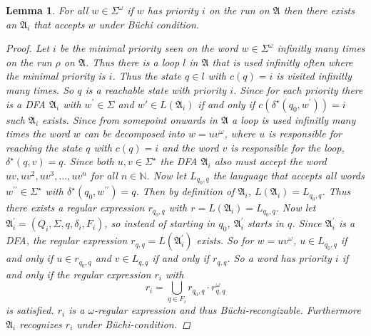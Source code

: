 \documentclass[10pt]{article}
\theoremstyle{definition}
\theoremstyle{plain}
\newtheorem{lemma}{Lemma}
\theoremstyle{remark}
\begin{document}
  \begin{lemma}
    For all $w\in \Sigma^\omega$ if $w$ has priority $i$ on the run on
    $\mathfrak{A}$ then there exists an $\mathfrak{A}_i$ that accepts $w$ under
    Büchi condition.
    \begin{proof}
      Let $i$ be the minimal priority seen on the word $w\in\Sigma^\omega$
      infinitly many times on the run $\rho$ on $\mathfrak{A}$. Thus there is a
      loop $l$ in $\mathfrak{A}$ that is used infinitly often where the minimal 
      priority is $i$. Thus the state $q\in l$ with $c(q)=i$ is visited infinitly 
      many times. So $q$ is a reachable state with priority $i$. Since for each
      priority there is a DFA $\mathfrak{A}_i$ with $w^\prime\in\Sigma$ and $
      w\prime \in L(\mathfrak{A}_i)$ if and only if $c(\delta^\star(q_0,w^\prime))=i$
      such $\mathfrak{A}_i$ exists.
      Since from somepoint onwards in $\mathfrak{A}$ a loop is used infinitly
      many times the word $w$ can be decomposed into $w=uv^\omega$, where $u$ is
      responsible for reaching the state $q$ with $c(q)=i$ and the word $v$ is
      responsible for the loop, $\delta^\star(q,v)=q$. Since both $u,v\in
      \Sigma^\star$ the DFA $\mathfrak{A}_i$ also must accept the word $uv,
      uv^2,uv^3,\dots,uv^n$ for all $n\in\mathbb{N}$. Now let
      $L_{q_0,q}$ the language that accepts all words 
      $w^{\prime\prime}\in \Sigma^\star$  with 
      $\delta^\star(q_0,w^{\prime\prime})=q$. Then by definition of
      $\mathfrak{A}_i$, $L(\mathfrak{A}_i)=L_{q_0,q}$. Thus there exists a
      regular expression $r_{q_0,q}$ with $r=L(\mathfrak{A}_i)=L_{q_0,q}$. Now let
      $\mathfrak{A}_i^\prime=(Q_i,\Sigma,q,\delta_i,F_i)$, so instead of
      starting in $q_0$, $\mathfrak{A}_i^\prime$ starts in $q$.
      Since $\mathfrak{A}_i^\prime$ is a DFA, the regular expression
      $r_{q,q}=L(\mathfrak{A}_i^\prime)$ exists. 
      So for $w=uv^\omega$, $u\in L_{q_0,q}$ if and only if $u\in r_{q_0,q}$ and $v\in
      L_{q,q}$ if and only if $r_{q,q}$. So a word has priority $i$ if and only
      if the regular expression $r_i$ with
      \begin{displaymath}
        r_i = \bigcup\limits_{q\in F_i} r_{q_0,q} \cdot r_{q,q}^\omega
      \end{displaymath}
      is satisfied. $r_i$ is a $\omega$-regular expression and thus
      Büchi-recongizable. Furthermore $\mathfrak{A}_i$ recognizes $r_i$ under
      Büchi-condition.

    \end{proof}
  \end{lemma}
\end{document}
